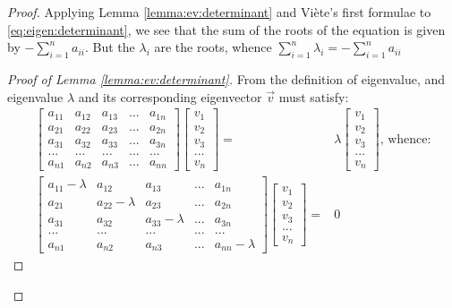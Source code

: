 \documentclass[]{article}
\begin{document}
\begin{proof}
	Applying Lemma \ref{lemma:ev:determinant} and Vi\`ete's first formulae\cite{enwiki:1030161470} to \eqref{eq:eigen:determinant}, we see that the sum of the roots of the equation is given by $-\sum_{i=1}^{n}a_{ii}$. But the $\lambda_i$ are the roots, whence $\sum_{i=1}^{n}\lambda_i=-\sum_{i=1}^{n}a_{ii}$
	\begin{proof}[Proof of Lemma \ref{lemma:ev:determinant}]
		From the definition of eigenvalue, and eigenvalue $\lambda$ and its corresponding eigenvector $\vec{v}$ must satisfy:
		\begin{align*}
			\begin{bmatrix}
				a_{11}&a_{12}&a_{13}&...&a_{1n}\\
				a_{21}&a_{22}&a_{23}&...&a_{2n}\\
				a_{31}&a_{32}&a_{33}&...&a_{3n}\\
				...&...&...&...&...\\
				a_{n1}&a_{n2}&a_{n3}&...&a_{nn}
			\end{bmatrix}\begin{bmatrix}
				v_1\\
				v_2\\
				v_3\\
				...\\
				v_n
			\end{bmatrix}=&\lambda \begin{bmatrix}
				v_1\\
				v_2\\
				v_3\\
				...\\
				v_n
			\end{bmatrix} \text{, whence:} \\
			\begin{bmatrix}
				a_{11}-\lambda&a_{12}&a_{13}&...&a_{1n}\\
				a_{21}&a_{22}-\lambda&a_{23}&...&a_{2n}\\
				a_{31}&a_{32}&a_{33}-\lambda&...&a_{3n}\\
				...&...&...&...&...\\
				a_{n1}&a_{n2}&a_{n3}&...&a_{nn}-\lambda
			\end{bmatrix}\begin{bmatrix}
				v_1\\
				v_2\\
				v_3\\
				...\\
				v_n
			\end{bmatrix}=&0
		\end{align*}

\end{proof}
\end{proof}
\end{document}
